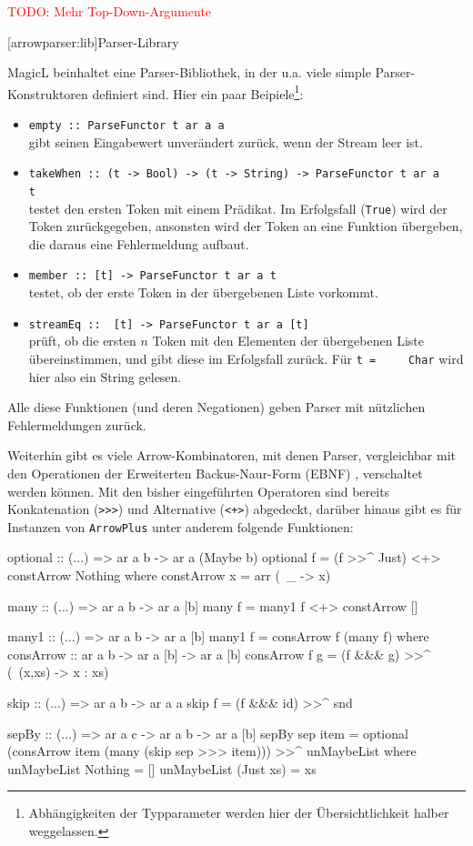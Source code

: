 \documentclass[12pt, a4paper, bibgerm]{scrbook}
\newenvironment{DIFnomarkup}{}{}
\newcommand\icode[1]{\lstinline?#1?}
\newcommand{\todo}[1]{
  \textcolor{red}{TODO: #1}
}
\newcommand\lsection{}
\begin{document}
\todo{Mehr Top-Down-Argumente}

\lsection[arrowparser:lib]{Parser-Library}

MagicL beinhaltet eine Parser-Bibliothek, in der u.a. viele simple
Parser-Konstruktoren definiert sind. Hier ein paar
Beipiele\footnote{Abhängigkeiten der Typparameter werden hier der
  Übersichtlichkeit halber weggelassen.}:
\begin{itemize}
\item \icode{empty :: ParseFunctor t ar a a}\\
  gibt seinen Eingabewert unverändert zurück, wenn der Stream leer ist.
\item \icode{takeWhen :: (t -> Bool) -> (t -> String) -> ParseFunctor t ar a
    t}\\
  testet den ersten Token mit einem Prädikat. Im Erfolgsfall (\icode{True}) wird der
  Token zurückgegeben, ansonsten wird der Token an eine Funktion
  übergeben, die daraus eine Fehlermeldung aufbaut.
\item \icode{member :: [t] -> ParseFunctor t ar a t}\\
  testet, ob der erste Token in der übergebenen Liste vorkommt.
\item \icode{streamEq ::  [t] -> ParseFunctor t ar a [t]}\\
  prüft, ob die ersten $n$ Token mit den Elementen der übergebenen Liste
  übereinstimmen, und gibt diese im Erfolgsfall zurück. Für \icode{t =
    Char} wird hier also ein String gelesen.
\end{itemize}

Alle diese Funktionen (und deren Negationen) geben Parser mit nützlichen
Fehlermeldungen zurück.

Weiterhin gibt es viele Arrow-Kombinatoren, mit denen Parser,
vergleichbar mit den Operationen der Erweiterten Backus-Naur-Form (EBNF)
\cite[S.43ff]{EBNF}, verschaltet werden können. Mit den bisher eingeführten
Operatoren sind bereits Konkatenation (\icode{>>>}) %
und Alternative (\icode{<+>}) abgedeckt, darüber hinaus gibt es für
Instanzen von \icode{ArrowPlus} unter anderem folgende Funktionen:

\begin{DIFnomarkup}\begin{code}
optional :: (...) => ar a b -> ar a (Maybe b)
optional f = (f >>^ Just) <+> constArrow Nothing
  where constArrow x = arr (\ _ -> x)

many :: (...) => ar a b -> ar a [b]
many f = many1 f <+> constArrow []

many1 :: (...) => ar a b -> ar a [b]
many1 f = consArrow f (many f)
  where consArrow :: ar a b -> ar a [b] -> ar a [b]
        consArrow f g = (f &&& g) >>^ (\ (x,xs) -> x : xs)

skip :: (...) => ar a b -> ar a a
skip f = (f &&& id) >>^ snd

sepBy :: (...) => ar a c -> ar a b -> ar a [b]
sepBy sep item =
  optional (consArrow item (many (skip sep >>> item))) >>^ unMaybeList
    where
      unMaybeList  Nothing  = []
      unMaybeList (Just xs) = xs
\end{code}\end{DIFnomarkup} %
\end{document}

